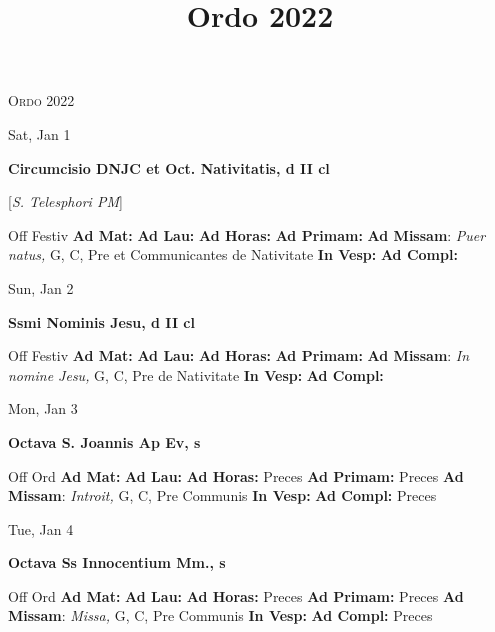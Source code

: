 \documentclass[10pt]{article}
\title{Ordo 2022}
\begin{document}
\begin{center}
\textsc{\Huge Ordo 2022}
\end{center}

\begin{minipage}{3.5in}
\vspace{2em}\begin{center}
Sat, Jan 1
\end{center}\textbf{ \large Circumcisio DNJC et Oct. Nativitatis, \textnormal{\normalsize d II cl}}

[\textit{S. Telesphori PM}]
\begin{justify}
Off Festiv
\textbf{Ad Mat: }
\textbf{Ad Lau: }
\textbf{Ad Horas: }
\textbf{Ad Primam: }
\textbf{Ad Missam}: \textit{Puer natus,} G, C, Pre et Communicantes de Nativitate
\textbf{In Vesp: }
\textbf{Ad Compl: }\end{justify}
\end{minipage}



\begin{minipage}{3.5in}
\vspace{2em}\begin{center}
Sun, Jan 2
\end{center}\textbf{ \large Ssmi Nominis Jesu, \textnormal{\normalsize d II cl}}
\begin{justify}
Off Festiv
\textbf{Ad Mat: }
\textbf{Ad Lau: }
\textbf{Ad Horas: }
\textbf{Ad Primam: }
\textbf{Ad Missam}: \textit{In nomine Jesu,} G, C, Pre de Nativitate
\textbf{In Vesp: }
\textbf{Ad Compl: }\end{justify}
\end{minipage}



\begin{minipage}{3.5in}
\vspace{2em}\begin{center}
Mon, Jan 3
\end{center}\textbf{ \large Octava S. Joannis Ap Ev, \textnormal{\normalsize s}}
\begin{justify}
Off Ord
\textbf{Ad Mat: }
\textbf{Ad Lau: }
\textbf{Ad Horas: }Preces
\textbf{Ad Primam: }Preces
\textbf{Ad Missam}: \textit{Introit,} G, C, Pre Communis
\textbf{In Vesp: }
\textbf{Ad Compl: }Preces\end{justify}
\end{minipage}



\begin{minipage}{3.5in}
\vspace{2em}\begin{center}
Tue, Jan 4
\end{center}\textbf{ \large Octava Ss Innocentium Mm., \textnormal{\normalsize s}}
\begin{justify}
Off Ord
\textbf{Ad Mat: }
\textbf{Ad Lau: }
\textbf{Ad Horas: }Preces
\textbf{Ad Primam: }Preces
\textbf{Ad Missam}: \textit{Missa,} G, C, Pre Communis
\textbf{In Vesp: }
\textbf{Ad Compl: }Preces\end{justify}
\end{minipage}
\end{document}
